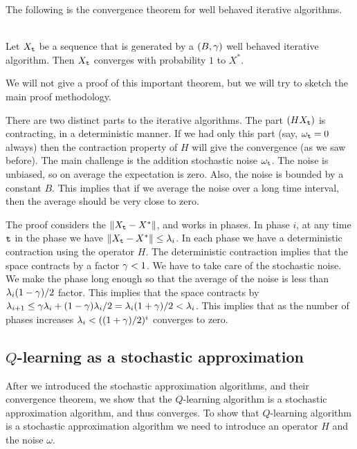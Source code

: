 The following is the convergence theorem for well behaved iterative
algorithms.

\begin{theorem}\ \\
\label{thm:stoch-approx}
 Let $X_{\tt t}$ be a sequence that is generated by a
$(B,\gamma)$ well behaved iterative algorithm. Then $X_{\tt t}$
converges with probability $1$ to $X^*$.
\end{theorem}

We will not give a proof of this important theorem, but we will try
to sketch the main proof methodology.

There are two distinct parts to the iterative algorithms. The part
$(HX_{\tt t})$ is contracting, in a deterministic manner. If we had
only this part (say, $\omega_{\tt t}=0$ always) then the contraction
property of $H$ will give the convergence (as we saw before). The
main challenge is the addition stochastic noise $\omega_{\tt t}$. The
noise is unbiased, so on average the expectation is zero. Also, the
noise is bounded by a constant $B$. This implies that if we average
the noise over a long time interval, then the average should be very
close to zero.

The proof considers the $\|X_{\tt t}-X^*\|$, and  works in phases. In
phase $i$, at any time ${\tt t}$ in the phase we have
$\|X_{\tt t}-X^*\|\leq \lambda_i$.
%
In each phase we have a deterministic contraction using the operator
$H$. The deterministic contraction implies that
the space contracts by a factor $\gamma<1$. We have to take care
of the stochastic noise. We make the phase long enough so that the
average of the noise is less than $\lambda_i (1-\gamma)/2$ factor. This
implies that the space contracts by
$\lambda_{i+1}\leq\gamma\lambda_i+(1-\gamma)\lambda_i/2=\lambda_i(1+\gamma)/2<\lambda_i $. This implies
that as the number of phases increases $\lambda_i<
((1+\gamma)/2)^i$ converges to zero.

\subsection{$Q$-learning as a stochastic approximation}
After we introduced the stochastic approximation algorithms, and
their convergence theorem, we show that the $Q$-learning algorithm
is a stochastic approximation algorithm, and thus converges.
%
To show that $Q$-learning algorithm is a stochastic approximation
algorithm we need to introduce an operator $H$ and the noise
$\omega$.

